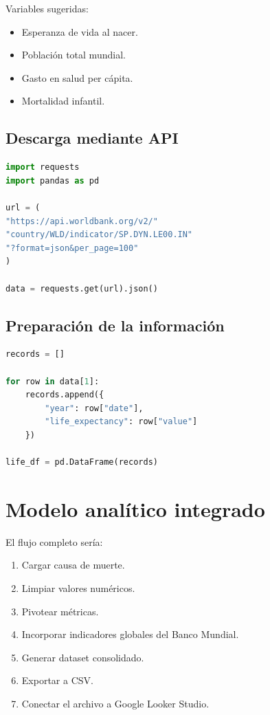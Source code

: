 \documentclass[12pt,a4paper]{article}
\begin{document}
Variables sugeridas:

\begin{itemize}
\item Esperanza de vida al nacer.
\item Población total mundial.
\item Gasto en salud per cápita.
\item Mortalidad infantil.
\end{itemize}

\subsection{Descarga mediante API}

\begin{lstlisting}[language=Python]
import requests
import pandas as pd

url = (
"https://api.worldbank.org/v2/"
"country/WLD/indicator/SP.DYN.LE00.IN"
"?format=json&per_page=100"
)

data = requests.get(url).json()
\end{lstlisting}

\subsection{Preparación de la información}

\begin{lstlisting}[language=Python]
records = []

for row in data[1]:
    records.append({
        "year": row["date"],
        "life_expectancy": row["value"]
    })

life_df = pd.DataFrame(records)
\end{lstlisting}

\section{Modelo analítico integrado}

El flujo completo sería:

\begin{enumerate}
\item Cargar causa de muerte.
\item Limpiar valores numéricos.
\item Pivotear métricas.
\item Incorporar indicadores globales del Banco Mundial.
\item Generar dataset consolidado.
\item Exportar a CSV.
\item Conectar el archivo a Google Looker Studio.
\end{enumerate}
\end{document}
